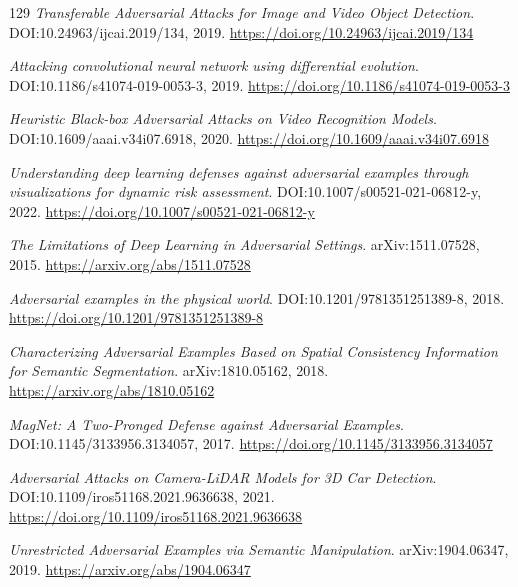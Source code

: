 \documentclass[11pt,a4paper]{article}
\begin{document}
\begin{thebibliography}{129}
\newblock \emph{Transferable Adversarial Attacks for Image and Video Object Detection}.
\newblock DOI:10.24963/ijcai.2019/134, 2019.
\newblock \url{https://doi.org/10.24963/ijcai.2019/134}

\newblock \emph{Attacking convolutional neural network using differential evolution}.
\newblock DOI:10.1186/s41074-019-0053-3, 2019.
\newblock \url{https://doi.org/10.1186/s41074-019-0053-3}

\newblock \emph{Heuristic Black-box Adversarial Attacks on Video Recognition Models}.
\newblock DOI:10.1609/aaai.v34i07.6918, 2020.
\newblock \url{https://doi.org/10.1609/aaai.v34i07.6918}

\newblock \emph{Understanding deep learning defenses against adversarial examples through visualizations for dynamic risk assessment}.
\newblock DOI:10.1007/s00521-021-06812-y, 2022.
\newblock \url{https://doi.org/10.1007/s00521-021-06812-y}

\newblock \emph{The Limitations of Deep Learning in Adversarial Settings}.
\newblock arXiv:1511.07528, 2015.
\newblock \url{https://arxiv.org/abs/1511.07528}

\newblock \emph{Adversarial examples in the physical world}.
\newblock DOI:10.1201/9781351251389-8, 2018.
\newblock \url{https://doi.org/10.1201/9781351251389-8}

\newblock \emph{Characterizing Adversarial Examples Based on Spatial Consistency Information for Semantic Segmentation}.
\newblock arXiv:1810.05162, 2018.
\newblock \url{https://arxiv.org/abs/1810.05162}

\newblock \emph{MagNet: A Two-Pronged Defense against Adversarial Examples}.
\newblock DOI:10.1145/3133956.3134057, 2017.
\newblock \url{https://doi.org/10.1145/3133956.3134057}

\newblock \emph{Adversarial Attacks on Camera-LiDAR Models for 3D Car Detection}.
\newblock DOI:10.1109/iros51168.2021.9636638, 2021.
\newblock \url{https://doi.org/10.1109/iros51168.2021.9636638}

\newblock \emph{Unrestricted Adversarial Examples via Semantic Manipulation}.
\newblock arXiv:1904.06347, 2019.
\newblock \url{https://arxiv.org/abs/1904.06347}


\end{thebibliography}
\end{document}
